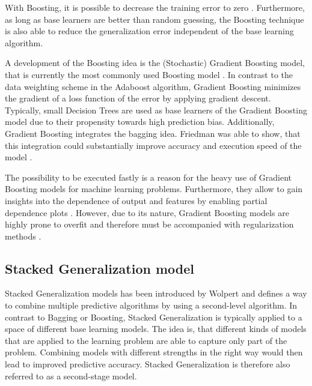 \documentclass[12pt]{article}
\begin{document}
With Boosting, it is possible to decrease the training error to zero \citep[p.11ff.]{freund1996experiments}. Furthermore, as long as base learners are better than random guessing, the Boosting technique is also able to reduce the generalization error independent of the base learning algorithm.

A development of the Boosting idea is the (Stochastic) Gradient Boosting model, that is currently the most commonly used Boosting model \citep{friedman2001greedy, friedman2002stochastic}. In contrast to the data weighting scheme in the Adaboost algorithm, Gradient Boosting minimizes the gradient of a loss function of the error by applying gradient descent. Typically, small Decision Trees are used as base learners of the Gradient Boosting model due to their propensity towards high prediction bias. Additionally, Gradient Boosting integrates the bagging idea. Friedman was able to show, that this integration could substantially improve accuracy and execution speed of the model \citep{friedman2002stochastic}.

The possibility to be executed fastly is a reason for the heavy use of Gradient Boosting models for machine learning problems. Furthermore, they allow to gain insights into the dependence of output and features by enabling partial dependence plots \citep[p.1219ff.]{friedman2001greedy}. However, due to its nature, Gradient Boosting models are highly prone to overfit and therefore must be accompanied with regularization methods \citep[p.1203]{friedman2002stochastic}.


\subsection{Stacked Generalization model}\label{stacking}
Stacked Generalization models has been introduced by Wolpert \citeyear{wolpert1992stacked} and defines a way to combine multiple predictive algorithms by using a second-level algorithm. In contrast to Bagging or Boosting, Stacked Generalization is typically applied to a space of different base learning models. The idea is, that different kinds of models that are applied to the learning problem are able to capture only part of the problem. Combining models with different strengths in the right way would then lead to improved predictive accuracy. Stacked Generalization is therefore also referred to as a second-stage model.
\end{document}
